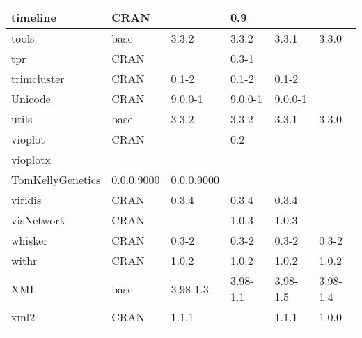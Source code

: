 \begin{longtable}{|llllll|}
timeline                      & CRAN                      &             & 0.9         &                &                  \\ \hline
tools                         & base                      & 3.3.2       & 3.3.2       & 3.3.1          & 3.3.0             \\ \hline \rowcolor{gray!25}
tpr                           & CRAN                      &             & 0.3-1       &                &                  \\ \hline
trimcluster                   & CRAN                      & 0.1-2       & 0.1-2       & 0.1-2          &                   \\ \hline \rowcolor{gray!25}
Unicode                       & CRAN                      & 9.0.0-1     & 9.0.0-1     & 9.0.0-1        &                  \\ \hline
utils                         & base                      & 3.3.2       & 3.3.2       & 3.3.1          & 3.3.0             \\ \hline \rowcolor{gray!25}
vioplot                       & CRAN                      &             & 0.2         &                &                  \\ \hline
vioplotx                      & \begin{tabular}[c]{@{}l@{}}GitHub \\ TomKellyGenetics \end{tabular}  & 0.0.0.9000  & 0.0.0.9000  &                &                   \\ \hline \rowcolor{gray!25}
viridis                       & CRAN                      & 0.3.4       & 0.3.4       & 0.3.4          &                  \\ \hline
visNetwork                    & CRAN                      &             & 1.0.3       & 1.0.3          &                   \\ \hline \rowcolor{gray!25}
whisker                       & CRAN                      & 0.3-2       & 0.3-2       & 0.3-2          & 0.3-2            \\ \hline
withr                         & CRAN                      & 1.0.2       & 1.0.2       & 1.0.2          & 1.0.2             \\ \hline \rowcolor{gray!25}
XML                           & base                      & 3.98-1.3    & 3.98-1.1    & 3.98-1.5       & 3.98-1.4         \\ \hline
xml2                          & CRAN                      & 1.1.1       &             & 1.1.1          & 1.0.0             \\ \hline \rowcolor{gray!25}

\end{longtable}
